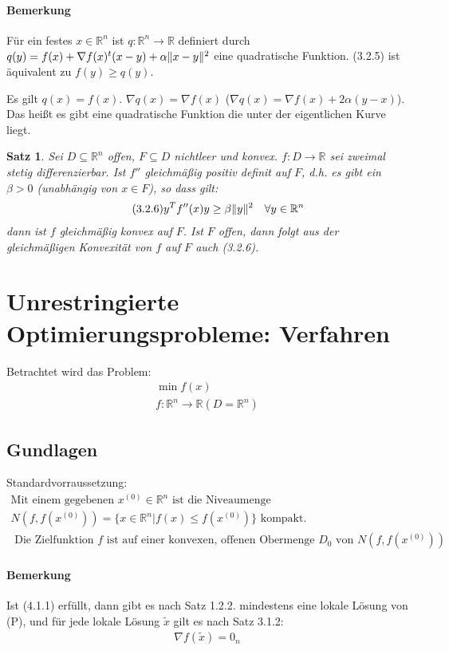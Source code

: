\documentclass[ngerman,halfparskip]{scrartcl}
\DeclarePairedDelimiter{\norm}{\lVert}{\rVert}
\newtheorem*{satz}{Satz}
\theoremstyle{definition}
\newcommand*{\R}{\mathbb{R}}      %
\begin{document}
\paragraph*{Bemerkung} Für ein festes $x\in\R^n$ ist $q\colon \R^n\rightarrow\R$ definiert durch $q(y)=f(x)+\nabla f(x)^t(x-y)+\alpha \norm{x-y}^2$ eine quadratische Funktion. (3.2.5) ist äquivalent zu $f(y)\geq q(y)$.

Es gilt $q(x)=f(x)$. $\nabla q(x)=\nabla f(x)$ ($\nabla q(x)=\nabla f(x)+2\alpha(y-x)$). Das heißt es gibt eine quadratische Funktion die unter der eigentlichen Kurve liegt. 

\begin{satz}
Sei $D\subseteq \R^n$ offen, $F\subseteq D$ nichtleer und konvex.  $f\colon D\rightarrow\R$ sei zweimal stetig differenzierbar. Ist $f''$ gleichmäßig positiv definit auf $F$, d.h. es gibt ein $\beta >0$ (unabhängig von $x\in F$), so dass gilt:
\begin{gather}\tag{3.2.6}
y^Tf''(x)y\geq \beta \norm{y}^2\quad \forall y\in\R^n
\end{gather}
dann ist $f$ gleichmäßig konvex auf $F$. Ist $F$ offen, dann folgt aus der gleichmäßigen Konvexität von $f$ auf $F$ auch (3.2.6).
\end{satz}

\section{Unrestringierte Optimierungsprobleme: Verfahren}
Betrachtet wird das Problem:
\begin{gather*}\tag{PU}
\min f(x)\\
f\colon \R^n\rightarrow \R (D=\R^n)
\end{gather*}
\subsection{Gundlagen}
Standardvorraussetzung:
\begin{gather*}\tag{4.1.1}
\text{Mit einem gegebenen }x^{(0)}\in\R^n \text{ ist die Niveaumenge }\\ N(f,f(x^{(0)}))=\{x\in\R^n | f(x)\leq f(x^{(0)})\} \text{ kompakt.}\\\text{ Die Zielfunktion }f \text{ ist auf einer konvexen, offenen Obermenge }D_0 \text{ von }N(f,f(x^{(0)}))
\end{gather*}

\paragraph{Bemerkung} Ist (4.1.1) erfüllt, dann gibt  es nach Satz 1.2.2. mindestens eine lokale Lösung von (P), und für jede lokale Lösung $\tilde x$ gilt es nach Satz 3.1.2:
\begin{gather}
\tag{4.1.2} \nabla f (\tilde x)=0_n
\end{gather}
\end{document}
